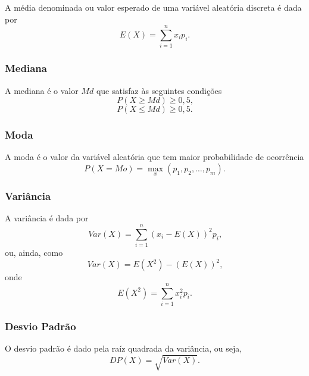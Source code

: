 A média denominada  ou valor esperado de uma variável aleatória discreta é dada por
\begin{equation}
	E(X)=\sum_{i=1}^{n} x_i p_i\text{.}
\end{equation}

\subsubsection*{Mediana}

A mediana é o valor $Md$ que satisfaz às seguintes condições
\begin{equation}
	P(X \geqslant Md) \geqslant 0,5\text{,}
\end{equation}
\begin{equation}
	P(X \leqslant Md) \geqslant 0,5\text{.}
\end{equation}

\subsubsection*{Moda}

A moda é o valor da variável aleatória que tem maior probabilidade de ocorrência
\begin{equation}
	P(X=Mo)=\max_{x} (p_1, p_2, \dots, p_m)\text{.}
\end{equation}

\subsubsection*{Variância}

A variância é dada por
\begin{equation}
	Var(X)=\sum_{i=1}^{n} (x_i - E(X))^2 p_i\text{,}
\end{equation}
ou, ainda, como
\begin{equation}
	Var(X)=E(X^2)-(E(X))^2\text{,}
\end{equation}
onde 
\begin{equation}
	E(X^2)=\sum_{i=1}^{n} x_i^2 p_i\text{.}
\end{equation}

\subsubsection*{Desvio Padrão}

O desvio padrão é dado pela raíz quadrada da variância, ou seja,
\begin{equation}
	DP(X)=\sqrt{Var(X)}\text{.}
\end{equation}

